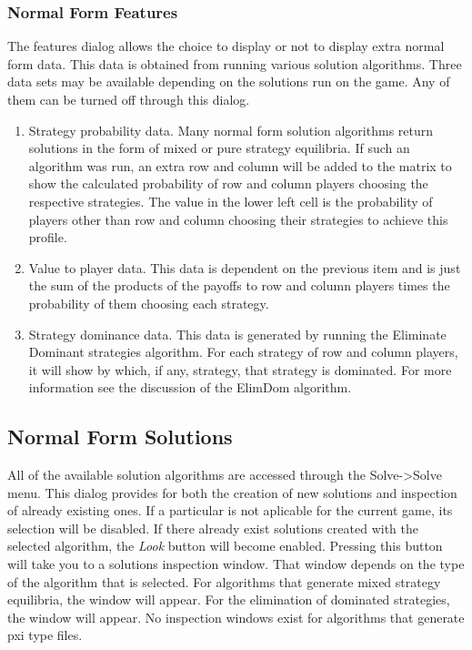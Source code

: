 \subsubsection{Normal Form Features}
The features dialog allows the choice to display or not to display extra
normal form data.  This data is obtained from running various solution
algorithms.  Three data sets may be available depending on the solutions
run on the game.  Any of them can be turned off through this dialog.
\begin{enumerate}
\item Strategy probability data.  Many normal form solution
algorithms return solutions in the form of mixed or pure strategy
equilibria.  If such an algorithm was run, an extra row and column will be
added to the matrix to show the calculated probability of row and column
players choosing the respective strategies.  The value in the lower left
cell is the probability of players other than row and column choosing
their strategies to achieve this profile.
\item Value to player data.  This data is dependent on the previous item
and is just the sum of the products of the payoffs to row and column
players times the probability of them choosing each strategy.
\item Strategy dominance data.  This data is generated by running
the Eliminate Dominant strategies algorithm.  For each strategy of row and
column players, it will show by which, if any, strategy, that strategy is
dominated.  For more information see the discussion of the ElimDom
algorithm.
\end{enumerate}

\subsection{Normal Form Solutions}\label{NormalFormSolutions}
All of the available solution algorithms are accessed through the
Solve->Solve menu.  This dialog provides for both the creation of new
solutions and inspection of already existing ones.  If a particular
  is not aplicable for the current game, 
its selection will be
disabled.  If there already exist solutions created with the selected
algorithm, the {\em Look} button will become enabled.  Pressing this
button will take you to a solutions inspection window.  That window
depends on the type of the algorithm that is selected.  For algorithms
that generate mixed strategy equilibria, the   window will appear.  For the elimination
of dominated strategies, the
 window will appear.  No
inspection windows exist for algorithms that generate pxi type files.

